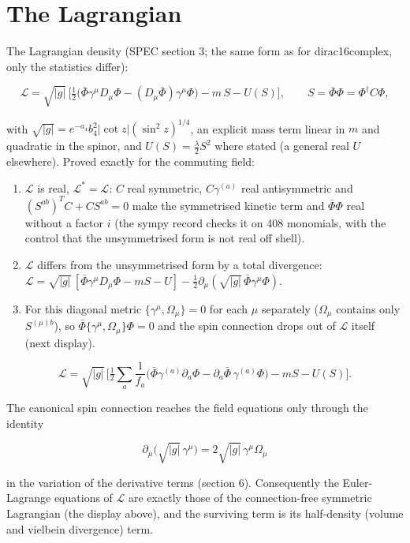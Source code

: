 \documentclass[11pt]{article}
\begin{document}
\section{The Lagrangian}

The Lagrangian density (SPEC section 3; the same form as for dirac16complex, only the statistics differ):

\[
\mathcal{L} = \sqrt{|g|}\,\Big[\tfrac12\big(\bar\Phi\gamma^\mu D_\mu\Phi - (D_\mu\bar\Phi)\gamma^\mu\Phi\big) - m\,S - U(S)\Big], \qquad S = \bar\Phi\Phi = \Phi^\dagger C\Phi ,
\]

with $\sqrt{|g|} = e^{-a_4}b_4^2|\cot z|(\sin^2 z)^{1/4}$, an explicit mass term linear in $m$ and quadratic in the spinor, and $U(S) = \tfrac{\lambda}{2}S^2$ where stated (a general real $U$ elsewhere). Proved exactly for the commuting field:

\begin{enumerate}
\item $\mathcal{L}$ is real, $\mathcal{L}^* = \mathcal{L}$: $C$ real symmetric, $C\gamma^{(a)}$ real antisymmetric and $(S^{ab})^TC + CS^{ab} = 0$ make the symmetrised kinetic term and $\bar\Phi\Phi$ real without a factor $i$ (the sympy record checks it on 408 monomials, with the control that the unsymmetrised form is not real off shell).
\item $\mathcal{L}$ differs from the unsymmetrised form by a total divergence: $\mathcal{L} = \sqrt{|g|}\,[\bar\Phi\gamma^\mu D_\mu\Phi - mS - U] - \tfrac12\partial_\mu(\sqrt{|g|}\,\bar\Phi\gamma^\mu\Phi)$.
\item For this diagonal metric $\{\gamma^\mu, \Omega_\mu\} = 0$ for each $\mu$ separately ($\Omega_\mu$ contains only $S^{(\mu)b}$), so $\bar\Phi\{\gamma^\mu, \Omega_\mu\}\Phi = 0$ and the spin connection drops out of $\mathcal{L}$ itself (next display).
\end{enumerate}

\[
\mathcal{L} = \sqrt{|g|}\,\Big[\tfrac12\sum_a \frac{1}{f_a}\big(\bar\Phi\gamma^{(a)}\partial_a\Phi - \partial_a\bar\Phi\,\gamma^{(a)}\Phi\big) - m S - U(S)\Big] .
\]

The canonical spin connection reaches the field equations only through the identity

\[
\partial_\mu\big(\sqrt{|g|}\,\gamma^\mu\big) = 2\sqrt{|g|}\,\gamma^\mu\Omega_\mu
\]

in the variation of the derivative terms (section 6). Consequently the Euler-Lagrange equations of $\mathcal{L}$ are exactly those of the connection-free symmetric Lagrangian (the display above), and the surviving term is its half-density (volume and vielbein divergence) term.
\end{document}
